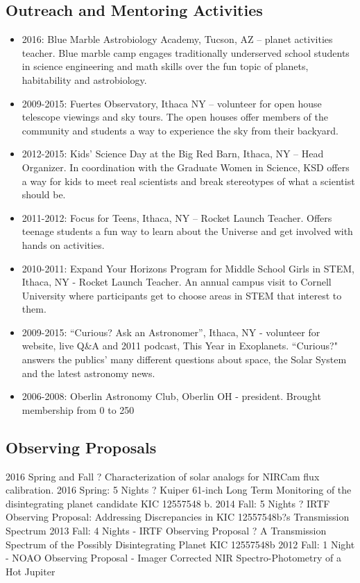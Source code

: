 \documentclass[11pt, oneside]{article}   	%
\begin{document}
\subsection*{Outreach and Mentoring Activities}
\begin{itemize}[noitemsep]
    \item 2016: Blue Marble Astrobiology Academy, Tucson, AZ -- planet activities teacher. Blue marble camp engages traditionally underserved school students in science engineering and math skills over the fun topic of planets, habitability and astrobiology.
    \item 2009-2015: Fuertes Observatory, Ithaca NY -- volunteer for open house telescope viewings and sky tours. The open houses offer members of the community and students a way to experience the sky from their backyard.
    \item 2012-2015: Kids' Science Day at the Big Red Barn, Ithaca, NY -- Head Organizer. In coordination with the Graduate Women in Science, KSD offers a way for kids to meet real scientists and break stereotypes of what a scientist should be.
    \item 2011-2012: Focus for Teens, Ithaca, NY -- Rocket Launch Teacher. Offers teenage students a fun way to learn about the Universe and get involved with hands on activities.
    \item 2010-2011: Expand Your Horizons Program for Middle School Girls in STEM, Ithaca, NY - Rocket Launch Teacher. An annual campus visit to Cornell University where participants get to choose areas in STEM that interest to them.
    \item 2009-2015: ``Curious? Ask an Astronomer'', Ithaca, NY - volunteer for website, live Q\&A and 2011 podcast, This Year in Exoplanets. ``Curious?" answers the publics' many different questions about space, the Solar System and the latest astronomy news.
    \item 2006-2008: Oberlin Astronomy Club, Oberlin OH - president. Brought membership from 0 to 250
 \end{itemize}

\subsection*{Observing Proposals}
2016 Spring and Fall ? Characterization of solar analogs for NIRCam flux calibration.
2016 Spring: 5 Nights ? Kuiper 61-inch Long Term Monitoring of the disintegrating planet candidate KIC 12557548 b.
2014 Fall: 5 Nights ? IRTF Observing Proposal: Addressing Discrepancies in KIC 12557548b?s Transmission Spectrum
2013 Fall: 4 Nights - IRTF Observing Proposal ? A Transmission Spectrum of the Possibly Disintegrating Planet KIC 12557548b
2012 Fall: 1 Night - NOAO Observing Proposal - Imager Corrected NIR Spectro-Photometry of a Hot Jupiter
\end{document}
